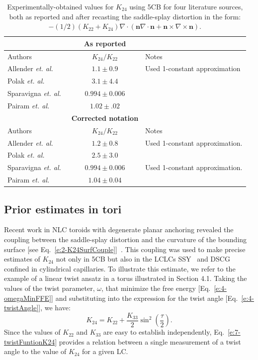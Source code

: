 \begin{table}[t]
  \centering
  \caption{Experimentally-obtained values for $K_{24}$ using 5CB for four literature sources, both as reported and after recasting the saddle-splay distortion in the form: $-(1/2)(K_{22} + K_{24})\nabla \cdot (\mathbf{n}\nabla \cdot \mathbf{n} + \mathbf{n} \times \nabla \times \mathbf{n})$.}
  \begin{tabular}{l c l}
    & {\bf As reported} & \\
    \hline
    Authors & $K_{24}/K_{22}$ & Notes \\
    \hline
    Allender \emph{et. al.}~\cite{allender1991determination} & $1.1 \pm 0.9$ & Used 1-constant approximation\\
    Polak \emph{et. al.}~\cite{polak1994optical} & $3.1 \pm 4.4$ \\
    Sparavigna \emph{et. al.}~\cite{sparavigna1994periodic} & $0.994 \pm 0.006$ \\
    Pairam \emph{et. al.}~\cite{RN24} & $1.02 \pm .02$ \\
    & {\bf Corrected notation} & \\
    \hline
    Authors & $K_{24}/K_{22}$ & Notes \\
    \hline
    Allender \emph{et. al.}~\cite{allender1991determination} & $1.2 \pm 0.8$ & Used 1-constant approximation. \\
    Polak \emph{et. al.}~\cite{polak1994optical} & $2.5 \pm 3.0$ \\
    Sparavigna \emph{et. al.}~\cite{sparavigna1994periodic} & $0.994 \pm 0.006$ & Used 1-constant approximation.\\
    Pairam \emph{et. al.}~\cite{RN24} & $1.04 \pm 0.04$ \\
  \end{tabular}
  \label{t:7-K24}
\end{table}


\subsection{Prior estimates in tori}
Recent work in NLC toroids with degenerate planar anchoring revealed the coupling between the saddle-splay distortion and the curvature of the bounding surface [see Eq.~\ref{e:2-K24SurfCouple}]~\cite{RN24,RN59}.
This coupling was used to make precise estimates of $K_{24}$ not only in 5CB but also in the LCLCs SSY~\cite{RN191,RN293} and DSCG~\cite{RN293} confined in cylindrical capillaries.
To illustrate this estimate, we refer to the example of a linear twist ansatz in a torus illustrated in Section 4.1.
Taking the values of the twist parameter, $\omega$, that minimize the free energy [Eq.~\ref{e:4-omegaMinFFE}] and substituting into the expression for the twist angle [Eq.~\ref{e:4-twistAngle}], we have:
\begin{equation}
  K_{24} = K_{22} + \frac{K_{33}}{2}\sin ^2 \left( \frac{\tau}{2} \right ).\label{e:7-twistFuntionK24}
\end{equation}
Since the values of $K_{22}$ and $K_{33}$ are easy to establish independently, Eq.~\ref{e:7-twistFuntionK24} provides a relation between a single measurement of a twist angle to the value of $K_{24}$ for a given LC.

